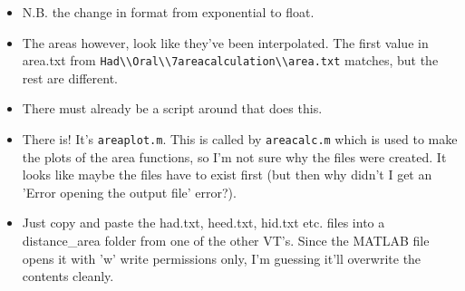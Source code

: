 \documentclass{article}
\begin{document}
\begin{itemize}
\begin{itemize}
        \item N.B. the change in format from exponential to float.
        \item The areas however, look like they've been interpolated. The first value in area.txt from \verb|Had\\Oral\\7areacalculation\\area.txt| matches, but the rest are different.
        \item There must already be a script around that does this.
        \item There is! It's \verb|areaplot.m|. This is called by \verb|areacalc.m| which is used to make the plots of the area functions, so I'm not sure why the files were created. It looks like maybe the files have to exist first (but then why didn't I get an 'Error opening the output file' error?).
        \item Just copy and paste the had.txt, heed.txt, hid.txt etc. files into a distance\_area folder from one of the other VT's. Since the MATLAB file opens it with 'w' write permissions only, I'm guessing it'll overwrite the contents cleanly. 
    \end{itemize}
\end{itemize}
\end{document}
